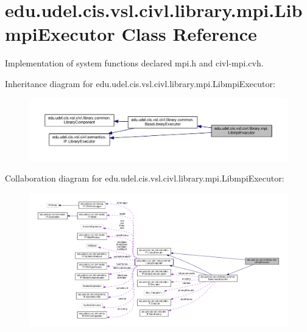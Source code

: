 \hypertarget{classedu_1_1udel_1_1cis_1_1vsl_1_1civl_1_1library_1_1mpi_1_1LibmpiExecutor}{}\section{edu.\+udel.\+cis.\+vsl.\+civl.\+library.\+mpi.\+Libmpi\+Executor Class Reference}
\label{classedu_1_1udel_1_1cis_1_1vsl_1_1civl_1_1library_1_1mpi_1_1LibmpiExecutor}


Implementation of system functions declared mpi.\+h and civl-\/mpi.\+cvh.  




Inheritance diagram for edu.\+udel.\+cis.\+vsl.\+civl.\+library.\+mpi.\+Libmpi\+Executor\+:
\nopagebreak
\begin{figure}[H]
\begin{center}
\leavevmode
\includegraphics[width=350pt]{classedu_1_1udel_1_1cis_1_1vsl_1_1civl_1_1library_1_1mpi_1_1LibmpiExecutor__inherit__graph}
\end{center}
\end{figure}


Collaboration diagram for edu.\+udel.\+cis.\+vsl.\+civl.\+library.\+mpi.\+Libmpi\+Executor\+:
\nopagebreak
\begin{figure}[H]
\begin{center}
\leavevmode
\includegraphics[width=350pt]{classedu_1_1udel_1_1cis_1_1vsl_1_1civl_1_1library_1_1mpi_1_1LibmpiExecutor__coll__graph}
\end{center}
\end{figure}
